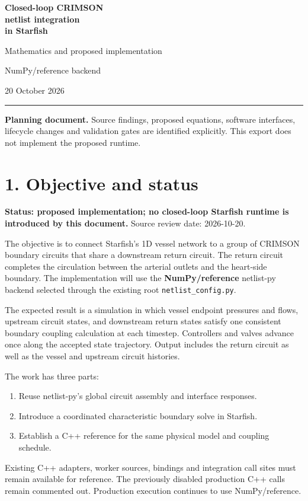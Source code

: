 \documentclass[11pt,a4paper]{article}
\begin{document}
\begin{titlepage}
\vspace*{28mm}
{\sffamily\color{navy}\Huge\bfseries Closed-loop CRIMSON\\[6pt]
netlist integration\\[6pt]in Starfish\par}
\vspace{12mm}
{\sffamily\Large Mathematics and proposed implementation\par}
\vspace{6mm}
{\large NumPy/reference backend\par}
\vspace{5mm}
20 October 2026
\vfill
\hrule\vspace{5mm}
\textbf{Planning document.} Source findings, proposed equations, software
interfaces, lifecycle changes and validation gates are identified explicitly.
This export does not implement the proposed runtime.
\vspace{5mm}
\end{titlepage}
\tableofcontents
\clearpage
{}
\section{1. Objective and status}
\textbf{Status: proposed implementation; no closed-loop Starfish runtime is introduced by this document.} Source review date: 2026-10-20.

The objective is to connect Starfish's 1D vessel network to a group of CRIMSON boundary circuits that share a downstream return circuit. The return circuit completes the circulation between the arterial outlets and the heart-side boundary. The implementation will use the \textbf{NumPy/reference} netlist-py backend selected through the existing root \texttt{netlist\_\allowbreak{}config.\allowbreak{}py}.

The expected result is a simulation in which vessel endpoint pressures and flows, upstream circuit states, and downstream return states satisfy one consistent boundary coupling calculation at each timestep. Controllers and valves advance once along the accepted state trajectory. Output includes the return circuit as well as the vessel and upstream circuit histories.

The work has three parts:


\begin{enumerate}
\item Reuse netlist-py's global circuit assembly and interface responses.


\item Introduce a coordinated characteristic boundary solve in Starfish.


\item Establish a C++ reference for the same physical model and coupling schedule.


\end{enumerate}
Existing C++ adapters, worker sources, bindings and integration call sites must remain available for reference. The previously disabled production C++ calls remain commented out. Production execution continues to use NumPy/reference.
\end{document}
